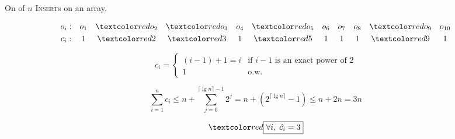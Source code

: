 \begin{frame}{}
  \centerline{}

  \pause
  \vspace{0.30cm}
  \centerline{On  of $n$ \textsc{Insert}s on an  array.}

  \pause
  \vspace{0.30cm}
  \[
    \begin{array}{ccccccccccc}
      o_i:  & o_1 & \red{o_2} & \red{o_3} & o_4 & \red{o_5} & o_6 & o_7 & o_8 & \red{o_9} & o_{10} \\[3pt]
      c_i:  & 1 & \red{2} & \red{3} & 1 & \red{5} & 1 & 1 & 1 & \red{9} & 1  \\
    \end{array}
  \]

  \pause
  \vspace{0.30cm}
  \begin{displaymath}
    c_i = \left\{ \begin{array}{ll}
      (i-1)+1 = i & \textrm{if $i - 1$ is an exact power of 2}\\
      1 & \textrm{o.w.}
    \end{array} \right.
  \end{displaymath}

  \pause
  \vspace{0.30cm}
  \[
    \sum_{i=1}^{n} c_i \le n + \sum_{j=0}^{\lceil \lg n \rceil - 1} 2^{j} = n +
    (2^{\lceil \lg n \rceil} - 1) \le n + 2n = 3n
  \]

  \pause
  \[
    \red{\boxed{\forall i,\; \hat{c_i} = 3}}
  \]
\end{frame}

\begin{frame}{}
  \centerline{}

  \vspace{0.50cm}
\end{frame}

